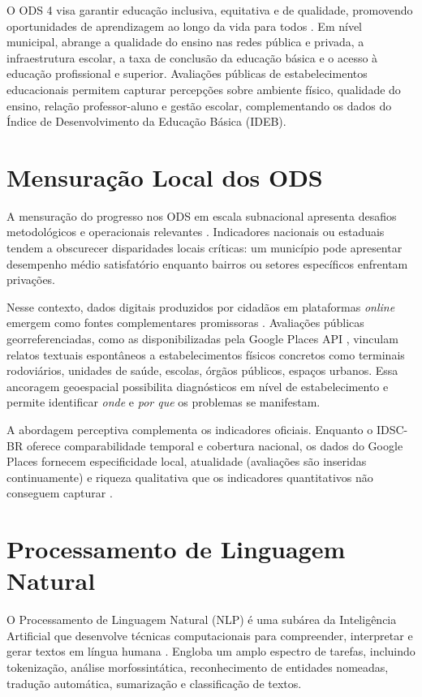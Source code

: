O ODS 4 visa garantir educação inclusiva, equitativa e de qualidade, promovendo
oportunidades de aprendizagem ao longo da vida para todos \cite{onu2015}. Em nível municipal,
abrange a qualidade do ensino nas redes pública e privada, a infraestrutura escolar, a taxa de
conclusão da educação básica e o acesso à educação profissional e superior. Avaliações públicas
de estabelecimentos educacionais permitem capturar percepções sobre ambiente físico, qualidade
do ensino, relação professor-aluno e gestão escolar, complementando os dados do Índice de
Desenvolvimento da Educação Básica (IDEB).

\section{Mensuração Local dos ODS}
\label{sec:mensuracao-local}

A mensuração do progresso nos ODS em escala subnacional apresenta desafios
metodológicos e operacionais relevantes \cite{abidoye2022}. Indicadores nacionais ou estaduais
tendem a obscurecer disparidades locais críticas: um município pode apresentar desempenho
médio satisfatório enquanto bairros ou setores específicos enfrentam privações.

Nesse contexto, dados digitais produzidos por cidadãos em plataformas \textit{online} emergem
como fontes complementares promissoras \cite{fu2023,larosa2025}. Avaliações públicas
georreferenciadas, como as disponibilizadas pela Google Places API \cite{googleplaces2024},
vinculam relatos textuais espontâneos a estabelecimentos físicos concretos como terminais
rodoviários, unidades de saúde, escolas, órgãos públicos, espaços urbanos. Essa ancoragem
geoespacial possibilita diagnósticos em nível de estabelecimento e permite identificar \emph{onde} e \emph{por que} os
problemas se manifestam.

A abordagem perceptiva complementa os indicadores oficiais. Enquanto
o IDSC-BR oferece comparabilidade temporal e cobertura nacional, os dados do Google Places
fornecem especificidade local, atualidade (avaliações são inseridas continuamente) e riqueza
qualitativa que os indicadores quantitativos não conseguem capturar \cite{wankhade2022}.

\section{Processamento de Linguagem Natural}
\label{sec:pln}

O Processamento de Linguagem Natural (\gls{NLP}) é uma subárea da Inteligência Artificial
que desenvolve técnicas computacionais para compreender, interpretar e gerar textos em língua
humana \cite{bird2009}. Engloba um amplo espectro de tarefas, incluindo tokenização,
análise morfossintática, reconhecimento de entidades nomeadas, tradução automática,
sumarização e classificação de textos.

